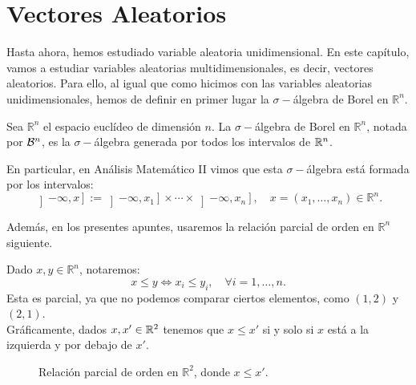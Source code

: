 \chapter{Vectores Aleatorios}

Hasta ahora, hemos estudiado variable aleatoria unidimensional.
En este capítulo, vamos a estudiar variables aleatorias multidimensionales, es decir, vectores aleatorios.
Para ello, al igual que como hicimos con las variables aleatorias unidimensionales, hemos de definir en primer lugar la $\sigma-$álgebra de Borel en $\mathbb{R}^n$.
\begin{definicion}
    Sea $\mathbb{R}^n$ el espacio euclídeo de dimensión $n$.
    La $\sigma-$álgebra de Borel en $\mathbb{R}^n$, notada por $\mathcal{B}^n$, es la $\sigma-$álgebra generada por todos los intervalos de $\mathbb{R}^n$.
\end{definicion}

En particular, en Análisis Matemático II vimos que esta $\sigma-$álgebra está formada por los intervalos:
\begin{equation*}
    \left]-\infty, x\right] := \left]-\infty, x_1\right] \times \cdots \times \left]-\infty, x_n\right], \quad x = (x_1, \ldots, x_n) \in \mathbb{R}^n.
\end{equation*}

Además, en los presentes apuntes, usaremos la relación parcial de orden en $\mathbb{R}^n$ siguiente.
\begin{notacion}
    Dado $x,y\in \mathbb{R}^n$, notaremos:
    \begin{equation*}
        x\leq y \iff x_i\leq y_i, \quad \forall i=1, \ldots, n.
    \end{equation*}
    Esta es parcial, ya que no podemos comparar ciertos elementos, como $(1, 2)$ y $(2, 1)$.\\

    Gráficamente, dados $x,x'\in \mathbb{R}^2$ tenemos que $x\leq x'$ si y solo si $x$ está a la izquierda y por debajo de $x'$.
    \begin{figure}[H]
        \centering
        \caption{Relación parcial de orden en $\mathbb{R}^2$, donde $x\leq x'$.}
    \end{figure}
\end{notacion}

